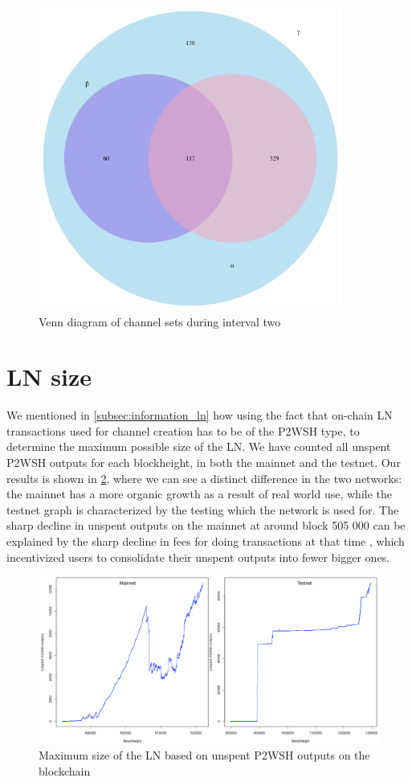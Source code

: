 \begin{figure}[ht]
    \centering
    \includegraphics[width=10cm]{figures/graphs/ven_run2.png}
    \caption{Venn diagram of channel sets during interval two}
    \label{fig:venn_run2}
\end{figure}

\section{LN size}

We mentioned in \cref{subsec:information_ln} how using the fact that on-chain LN transactions used for channel creation has to be of the P2WSH type, to determine the maximum possible size of the LN. We have counted all unspent P2WSH outputs for each blockheight, in both the mainnet and the testnet. Our results is shown in \cref{fig:ln_size}, where we can see a distinct difference in the two networks: the mainnet has a more organic growth as a result of real world use, while the testnet graph is characterized by the testing which the network is used for. The sharp decline in unspent outputs on the mainnet at around block 505 000 can be explained by the sharp decline in fees for doing transactions at that time \cite{mempool_stats}, which incentivized users to consolidate their unspent outputs into fewer bigger ones. 

\begin{figure}[h]
    \centering
    \includegraphics[width=16cm]{figures/graphs/ln_size_bc.png}
    \caption{Maximum size of the LN based on unspent P2WSH outputs on the blockchain}
    \label{fig:ln_size}
\end{figure}

